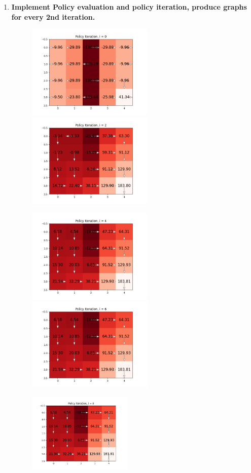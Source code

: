\documentclass[submit]{harvardml}
\begin{document}
\begin{enumerate}
    \item \textbf{Implement Policy evaluation and policy iteration, produce graphs for every 2nd iteration.}
    
    \begin{figure}[H]
        \centering
        \includegraphics[width=6cm]{hw6/plots/Policy_0.png}
        \includegraphics[width=6cm]{hw6/plots/Policy_2.png}
    \end{figure}
    \begin{figure}[H]
        \includegraphics[width=6cm]{hw6/plots/Policy_4.png}
        \includegraphics[width=6cm]{hw6/plots/Policy_6.png}
        \centering
    \end{figure}
    \begin{figure}[H]
        \includegraphics[width=5cm]{hw6/plots/Policy_8.png}
        \centering
    \end{figure}
    

\end{enumerate}
\end{document}
